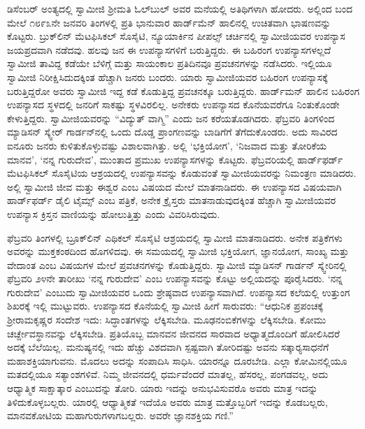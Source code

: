  ಡಿಸೆಂಬರ್ ಅಂತ್ಯದಲ್ಲಿ ಸ್ವಾಮೀಜಿ ಶ‍್ರೀಮತಿ ಓಲ್‍ಬುಲ್ ಅವರ ಮನೆಯಲ್ಲಿ ಅತಿಥಿಗಳಾಗಿ ಹೋದರು. ಅಲ್ಲಿಂದ ಬಂದ ಮೇಲೆ ೧೮೯೩ನೇ ಜನವರಿ ತಿಂಗಳಲ್ಲಿ ಪ್ರತಿ ಭಾನುವಾರ ಹಾರ್ಡ್‍ಮೆನ್ ಹಾಲಿನಲ್ಲಿ ಉಚಿತವಾಗಿ ಭಾಷಣವನ್ನು ಕೊಟ್ಟರು. ಬ್ರುಕ್‍ಲಿನ್ ಮೆಟಫಿಸಿಕಲ್ ಸೊಸೈಟಿ, ನ್ಯೂಯಾರ್ಕಿನ ಪೀಪಲ್ಸ್ ಚರ್ಚಿನಲ್ಲಿ ಸ್ವಾಮೀಜಿಯವರ ಉಪನ್ಯಾಸ ಜಯಪ್ರದವಾಗಿ ನಡೆದವು. ಹಲವು ಜನ ಈ ಉಪನ್ಯಾಸಗಳಿಗೆ ಬರುತ್ತಿದ್ದರು. ಈ ಬಹಿರಂಗ ಉಪನ್ಯಾಸಗಳಲ್ಲದೆ ಸ್ವಾಮೀಜಿ ತಾವಿದ್ದ ಕಡೆಯೇ ಬೆಳಿಗ್ಗೆ ಮತ್ತು ಸಾಯಂಕಾಲ ಪ್ರತಿದಿನವೂ ಪ್ರವಚನಗಳನ್ನು ನಡೆಸಿದರು. ಇಲ್ಲಿಯೂ ಸ್ವಾಮೀಜಿ ನಿರೀಕ್ಷಿಸಿದುದಕ್ಕಿಂತ ಹೆಚ್ಚಾಗಿ ಜನರು ಬಂದರು. ಯಾರು ಸ್ವಾಮೀಜಿಯವರ ಬಹಿರಂಗ ಉಪನ್ಯಾಸಕ್ಕೆ ಬರುತ್ತಿದ್ದರೋ ಅವರು ಸ್ವಾಮೀಜಿ ಇದ್ದ ಕಡೆ ಕೊಡುತ್ತಿದ್ದ ಪ್ರವಚನಕ್ಕೂ ಬರುತ್ತಿದ್ದರು. ಹಾರ್ಡ್‍ಮನ್ ಹಾಲಿನ ಬಹಿರಂಗ ಉಪನ್ಯಾಸದ ಸ್ಥಳದಲ್ಲಿ ಜನರಿಗೆ ಸಾಕಷ್ಟು ಸ್ಥಳವಿರಲಿಲ್ಲ. ಅನೇಕರು ಉಪನ್ಯಾಸದ ಕೊನೆಯವರೆಗೂ ನಿಂತುಕೊಂಡೇ ಕೇಳುತ್ತಿದ್ದರು. ಸ್ವಾಮೀಜಿಯವರನ್ನು “ವಿದ್ಯುತ್ ವಾಗ್ಮಿ” ಎಂದು ಜನ ಕರೆಯತೊಡಗಿದರು. ಫೆಬ್ರವರಿ ತಿಂಗಳಿಂದ ಮ್ಯಾಡಿಸನ್ ಸ್ಕ್ವೇರ್ ಗಾರ್ಡನ್‍ನಲ್ಲಿ ಒಂದು ದೊಡ್ಡ ಪ್ರಾಂಗಣವನ್ನು ಬಾಡಿಗೆಗೆ ತೆಗೆದುಕೊಂಡರು. ಅದು ಸಾವಿರದ ಐನೂರು ಜನರು ಕುಳಿತುಕೊಳ್ಳುವಷ್ಟು ವಿಶಾಲವಾಗಿತ್ತು. ಅಲ್ಲಿ ‘ಭಕ್ತಿಯೋಗ’, ‘ನಿಜವಾದ ಮತ್ತು ತೋರಿಕೆಯ ಮಾನವ’, ‘ನನ್ನ ಗುರುದೇವ’, ಮುಂತಾದ ಪ್ರಮುಖ ಉಪನ್ಯಾಸಗಳನ್ನು ಕೊಟ್ಟರು. ಫೆಬ್ರವರಿಯಲ್ಲಿ ಹಾರ್ಡ್‍ಫರ್ಡ್ ಮೆಟಫಿಸಿಕಲ್ ಸೊಸೈಟಿಯ ಆಶ್ರಯದಲ್ಲಿ ಉಪನ್ಯಾಸವನ್ನು ಕೊಡುವಂತೆ ಸ್ವಾಮೀಜಿಯವರನ್ನು ನಿಮಂತ್ರಣ ಮಾಡಿದರು. ಅಲ್ಲಿ ಸ್ವಾಮೀಜಿ ಜೀವ ಮತ್ತು ಈಶ್ವರ ಎಂಬ ವಿಷಯದ ಮೇಲೆ ಮಾತನಾಡಿದರು. ಈ ಉಪನ್ಯಾಸದ ವಿಷಯವಾಗಿ ಹಾರ್ಡ್‍ಫರ್ಡ್ ಡೈಲಿ ಟೈಮ್ಸ್ ಎಂಬ ಪತ್ರಿಕೆ, ಅನೇಕ ಕ್ರೈಸ್ತರು ಮಾತನಾಡುವುದಕ್ಕಿಂತ ಹೆಚ್ಚಾಗಿ ಸ್ವಾಮೀಜಿಯವರ ಉಪನ್ಯಾಸ ಕ್ರಿಸ್ತನ ವಾಣಿಯನ್ನು ಹೋಲುತ್ತಿತ್ತು ಎಂದು ವಿವರಿಸಿರುವುದು. 

 ಫೆಬ್ರವರಿ ತಿಂಗಳಲ್ಲಿ ಬ್ರೂಕ್‍ಲಿನ್ ಎಥಿಕಲ್ ಸೊಸೈಟಿ ಆಶ್ರಯದಲ್ಲಿ ಸ್ವಾಮೀಜಿ ಮಾತನಾಡಿದರು. ಅನೇಕ ಪತ್ರಿಕೆಗಳು ಅವರನ್ನು ಮುಕ್ತಕಂಠದಿಂದ ಹೊಗಳಿದವು. ಈ ಸಮಯದಲ್ಲಿ ಸ್ವಾಮೀಜಿ ಭಕ್ತಿಯೋಗ, ಜ್ಞಾನಯೋಗ, ಸಾಂಖ್ಯ ಮತ್ತು ವೇದಾಂತ ಎಂಬ ವಿಷಯಗಳ ಮೇಲೆ ಪ್ರವಚನಗಳನ್ನು ಕೊಡುತ್ತಿದ್ದರು. ಸ್ವಾಮೀಜಿ ಮ್ಯಾಡಿಸನ್ ಗಾರ್ಡನ್ ಸ್ಕ್ವೇರಿನಲ್ಲಿ ಫೆಬ್ರವರಿ ೨೪ನೇ ತಾರೀಖು ‘ನನ್ನ ಗುರುದೇವ’ ಎಂಬ ಉಪನ್ಯಾಸವನ್ನು ಕೊಟ್ಟು ಅಲ್ಲಿಯದನ್ನು ಪೂರೈಸಿದರು. ‘ನನ್ನ ಗುರುದೇವ’ ಎಂಬುದು ಸ್ವಾಮೀಜಿಯವರ ಒಂದು ಶ್ರೇಷ್ಠವಾದ ಉಪನ್ಯಾಸವಾಗಿದೆ. ಉಪನ್ಯಾಸದ ಕಲೆಯಲ್ಲಿ ಉತ್ತುಂಗ ಶಿಖರಕ್ಕೆ ಇಲ್ಲಿ ಮುಟ್ಟುವರು. ಉಪನ್ಯಾಸದ ಕೊನೆಯಲ್ಲಿ ಸ್ವಾಮೀಜಿ ಹೀಗೆ ಸಾರುವರು: “ಆಧುನಿಕ ಪ್ರಪಂಚಕ್ಕೆ ಶ‍್ರೀರಾಮಕೃಷ್ಣರ ಸಂದೇಶ ಇದು: ಸಿದ್ಧಾಂತಗಳನ್ನು ಲೆಕ್ಕಿಸಬೇಡಿ. ಮೂಢನಂಬಿಕೆಗಳನ್ನು ಲೆಕ್ಕಿಸಬೇಡಿ. ಕೋಮು ಚರ್ಚ್\break ದೇವಸ್ಥಾನವನ್ನು ಲೆಕ್ಕಿಸಬೇಡಿ. ಪ್ರತಿಯೊಬ್ಬ ಮಾನವನ ಜೀವನದ ಸಾರವಾದ ಅಧ್ಯಾತ್ಮದೊಂದಿಗೆ ಹೋಲಿಸಿದರೆ ಅದಕ್ಕೆ ಬೆಲೆಯಿಲ್ಲ. ಮನುಷ್ಯನಲ್ಲಿ ಇದು ಹೆಚ್ಚು ವಿಶದವಾಗಿ ಸ್ಪಷ್ಟವಾಗಿ ತೋರಿದಷ್ಟು ಅವನು ಸತ್ಕಾರ‍್ಯಸಾಧನೆಗೆ ಮಹಾಶಕ್ತಿಯಾಗುವನು. ಮೊದಲು ಅದನ್ನು ಸಂಪಾದಿಸಿ ಸಾಧಿಸಿ. ಯಾರನ್ನೂ ದೂರಬೇಡಿ. ಎಲ್ಲಾ ಕೋಮಿನಲ್ಲಿಯೂ ಮತದಲ್ಲಿಯೂ ಸತ್ಯಾಂಶಗಳಿವೆ. ನಿಮ್ಮ ಜೀವನದಲ್ಲಿ ಧರ್ಮವೆಂದರೆ ಮಾತಲ್ಲ, ಹೆಸರಲ್ಲ, ಪಂಗಡವಲ್ಲ, ಅದು ಆಧ್ಯಾತ್ಮಿಕ ಸಾಕ್ಷಾತ್ಕಾರ ಎಂಬುದನ್ನು ತೋರಿ. ಯಾರು ಇದನ್ನು ಅನುಭವಿಸುವರೊ ಅವರು ಮಾತ್ರ ಇದನ್ನು ತಿಳಿದುಕೊಳ್ಳಬಲ್ಲರು. ಯಾರಲ್ಲಿ ಆಧ್ಯಾತ್ಮಿಕತೆ ಇದೆಯೊ ಅವರು ಮಾತ್ರ ಮತ್ತೊಬ್ಬರಿಗೆ ಇದನ್ನು ಕೊಡಬಲ್ಲರು, ಮಾನವಕೋಟಿಯ ಮಹಾಗುರುಗಳಾಗಬಲ್ಲರು. ಅವರೇ ಜ್ಞಾನಶಕ್ತಿಯ ಗಣಿ.” 

